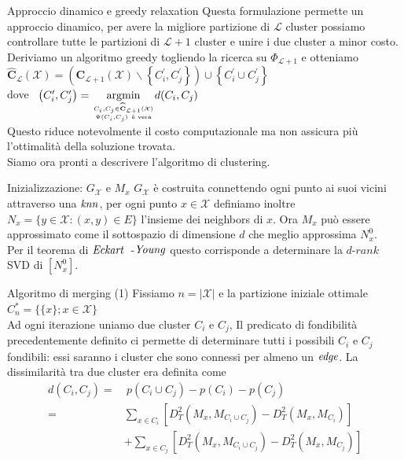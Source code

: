\documentclass[usenames,dvipsnames,9pt]{beamer}
\theoremstyle{definition}
\begin{document}
\begin{frame}{Approccio dinamico e greedy relaxation}
Questa formulazione permette un approccio dinamico, per avere la migliore partizione di $\mathcal{L}$ cluster possiamo controllare tutte le partizioni di $\mathcal{L} + 1$ cluster e unire i due cluster a minor costo. \\
Deriviamo un algoritmo greedy togliendo la ricerca su $\Phi_{\mathcal{L}+1}$ e otteniamo
\vskip 0.05in
$\widehat{\mathbf{C}}_{\mathcal{L}}(\mathcal{X})=\left(\mathbf{C}_{\mathcal{L}+1}(\mathcal{X}) \backslash\left\{C_{i}^{\prime}, C_{j}^{\prime}\right\}\right) \cup\left\{C_{i}^{\prime} \cup C_{j}^{\prime}\right\}$ \\
dove \ $\left(C_{i}^{\prime}, C_{j}^{\prime}\right)=\underset{C_{i}, C_{j} \in \widehat{\mathbf{C}}_{\mathcal{L} + 1}(\mathcal{X}) \atop \Psi(C_i, C_j) \ \text{è vera}}{\operatorname{argmin}}d(C_{i}, C_{j})$ \\
Questo riduce notevolmente il costo computazionale ma non assicura più l'ottimalità della soluzione trovata. \\
\vskip 0.1in
Siamo ora pronti a descrivere l'algoritmo di clustering.
\end{frame}

\begin{frame}{Inizializzazione: $G_\mathcal{X}$ e $M_x$}
$G_\mathcal{X}$ è costruita connettendo ogni punto ai suoi vicini attraverso una $\it{knn}$, per ogni punto $x\in\mathcal{X}$
definiamo inoltre $N_x = \{y\in\mathcal{X} : \left( x, y \right) \in E \}$ l'insieme dei neighbors di $x$.
Ora $M_x$ può essere approssimato come il sottospazio di dimensione $d$ che meglio approssima $N^{0}_x$. \\
Per il teorema di $\it{Eckart}$\ -$\it{Young}$ questo corrisponde a determinare la $d$-$rank$ SVD di $\left[N^{0}_x\right]$.
\end{frame}

\begin{frame}{Algoritmo di merging (1)}
Fissiamo $n=|\mathcal{X}|$ e la partizione iniziale ottimale $C^{*}_n = \{\{x\}; x\in\mathcal{X}\}$ \\
Ad ogni iterazione uniamo due cluster $C_i$ e $C_j$, Il predicato di fondibilità precedentemente definito ci permette
di determinare tutti i possibili $C_i$ e $C_j$ fondibili: essi saranno i cluster che sono connessi per almeno un $\it{edge}$.
La dissimilarità tra due cluster era definita come \\
\begin{equation*}
\begin{aligned}
d(C_i, C_j) =& \ p(C_i\cup C_j) - p(C_i) - p(C_j) \\
=& \sum_{x \in C_{i}} \left[D_{T}^{2}\left(M_{x}, M_{C_{i} \cup C_{j}}\right)- D_{T}^{2}\left(M_{x}, M_{C_{i}}\right)\right] \\
&+\sum_{x \in C_{j}} \left[D_{T}^{2}\left(M_{x}, M_{C_{i} \cup C_{j}}\right)-D_{T}^{2}\left(M_{x}, M_{C_{j}}\right)\right]
\end{aligned}
\end{equation*}
\end{frame}
\end{document}
